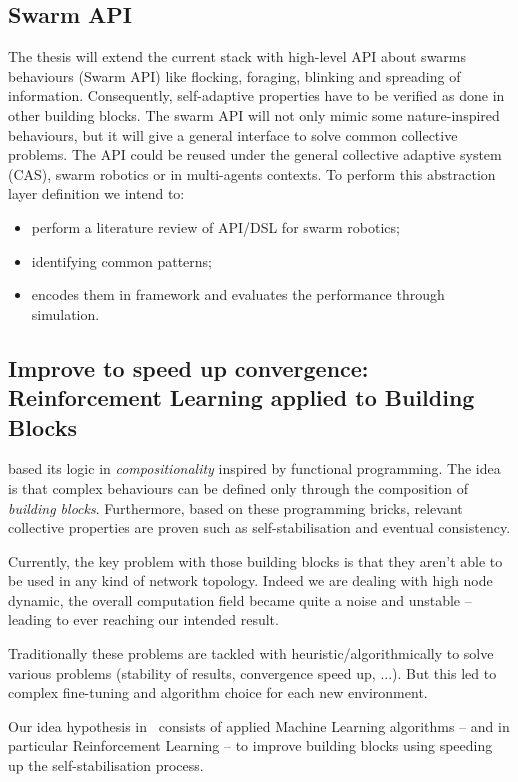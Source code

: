 \documentclass[11pt]{article}
\begin{document}
\subsection{Swarm API}
The thesis will extend the current \ac{} stack with high-level API about swarms behaviours (Swarm API) like flocking, foraging, blinking and spreading of information. Consequently, self-adaptive properties have to be verified as done in other building blocks.  The swarm API will not only mimic some nature-inspired behaviours, but it will give a general interface to solve common collective problems. The API could be reused under the general collective adaptive system (CAS), swarm robotics or in multi-agents contexts.
To perform this abstraction layer definition we intend to:
\begin{itemize}
	\item perform a literature review of API/DSL for swarm robotics;
	\item identifying common patterns;
	\item encodes them in \ac{} framework and evaluates the performance through simulation.
\end{itemize}
\subsection{Improve to speed up convergence: Reinforcement Learning applied to Building Blocks}
\ac{} based its logic in \textit{compositionality} inspired by functional programming. The idea is that complex behaviours can be defined only through the composition of \emph{building blocks}. Furthermore, based on these programming bricks, relevant collective properties are proven such as self-stabilisation and eventual consistency. 

Currently, the key problem with those building blocks is that they aren't able to be used in any kind of network topology. Indeed we are dealing with high node dynamic, the overall computation field became quite a noise and unstable -- leading to ever reaching our intended result.

Traditionally these problems are tackled with heuristic/algorithmically to solve various problems (stability of results, convergence speed up, ...). But this led to complex fine-tuning and algorithm choice for each new environment.

Our idea hypothesis in~\cite{research} consists of applied Machine Learning algorithms -- and in particular Reinforcement Learning -- to improve building blocks using speeding up the self-stabilisation process.
\end{document}
